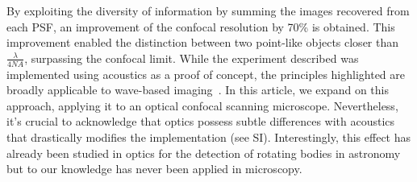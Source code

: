 \documentclass[%
reprint,
 amsmath,amssymb,
 aps,
]{revtex4-2}
\begin{document}
By exploiting the diversity of information by summing the images recovered from each PSF, an improvement of the confocal resolution by 70\% is obtained. This improvement enabled the distinction between two point-like objects closer than $\frac{\lambda}{4N\!A}$, surpassing the confocal limit. While the experiment described was implemented using acoustics as a proof of concept, the principles highlighted are broadly applicable to wave-based imaging~\cite{AcousticMicroscope}. In this article, we expand on this approach, applying it to an optical confocal scanning microscope. Nevertheless, it’s crucial to acknowledge that optics possess subtle differences with acoustics that drastically modifies the implementation (see SI). Interestingly, this effect has already been studied in optics for the detection of rotating bodies in astronomy \cite{LaveryRotDoppler} but to our knowledge has never been applied in microscopy. %

\end{document}
